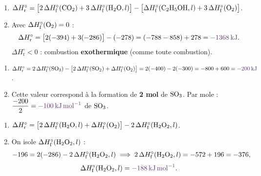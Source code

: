 \documentclass[11pt,a4paper]{article}
\newcommand{\dHr}{\Delta H^{\circ}_{\text{r}}}
\newcommand{\dHf}{\Delta H^{\circ}_{\text{f}}}
\newcommand{\rep}[1]{\textcolor{primarydark}{\textbf{#1}}}
\begin{document}
\begin{center}
\end{center}

\begin{correction}
\begin{enumerate}[label=\alph*),leftmargin=2em,topsep=2pt,itemsep=2pt]
  \item $\dHr = \big[2\,\dHf(\ce{CO2}) + 3\,\dHf(\ce{H2O},l)\big] - \big[\dHf(\ce{C2H5OH},l) + 3\,\dHf(\ce{O2})\big]$.
  \item Avec $\dHf(\ce{O2})=0$ :
  \[ \dHr = \big[2(-394) + 3(-286)\big] - (-278) = (-788 - 858) + 278 = \rep{\SI{-1368}{\kilo\joule}}. \]
  $\dHr<0$ : combustion \rep{exothermique} (comme toute combustion).
\end{enumerate}
\end{correction}

\begin{correction}
\begin{enumerate}[label=\alph*),leftmargin=2em,topsep=2pt,itemsep=2pt]
  \item $\dHr = 2\,\dHf(\ce{SO3}) - \big[2\,\dHf(\ce{SO2}) + \dHf(\ce{O2})\big]
        = 2(-400) - 2(-300) = -800 + 600 = \rep{\SI{-200}{\kilo\joule}}$.
  \item Cette valeur correspond à la formation de \rep{2 mol} de $\ce{SO3}$. Par mole :
        $\dfrac{-200}{2} = \rep{\SI{-100}{\kilo\joule\per\mol}}$ de $\ce{SO3}$.
\end{enumerate}
\end{correction}

\begin{correction}[remonter à un $\dHf$ inconnu]
\begin{enumerate}[label=\alph*),leftmargin=2em,topsep=2pt,itemsep=2pt]
  \item $\dHr = \big[2\,\dHf(\ce{H2O},l) + \dHf(\ce{O2})\big] - 2\,\dHf(\ce{H2O2},l)$.
  \item On isole $\dHf(\ce{H2O2},l)$ :
  \[ -196 = 2(-286) - 2\,\dHf(\ce{H2O2},l) \;\Longrightarrow\; 2\,\dHf(\ce{H2O2},l) = -572 + 196 = -376, \]
  \[ \dHf(\ce{H2O2},l) = \rep{\SI{-188}{\kilo\joule\per\mol}}. \]
\end{enumerate}
\end{correction}
\end{document}
